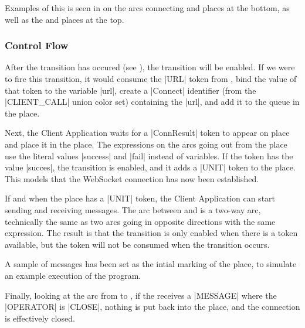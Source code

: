 		Examples of this is seen in  on the arcs connecting
		 and  places at the bottom, as well as the
		 and  places at the top.

	\subsubsection{Control Flow}
	
		After the  transition has occured (see ),
		the  transition will be enabled. If we were to fire this
		transition, it would consume the |URL| token from , bind
		the value of that token to the variable |url|, create a |Connect| identifier
		(from the |CLIENT_CALL| union color set) containing the |url|, and add it to
		the queue in the  place.
		
		Next, the Client Application waits for a |ConnResult| token to appear on
		place  and place it in the 
		place. The expressions on the arcs going out from the 
		place use the literal values |success| and |fail| instead of variables. If  the token has
		the value |succes|, the  transition is enabled, and it
		adds a |UNIT| token to the  place. This models
		that the WebSocket connection has now been established.
		
		If and when the  place has a |UNIT| token, the
		Client Application can start sending and receiving messages. The arc between
		 and  is a two-way arc,
		technically the same as two arcs going in opposite directions with the same
		expression.
		The result is that the transition is only enabled when there is a token
		available, but the token will not be consumed when the transition occurs. 
		
		A sample of messages has been set as the intial marking of the
		 place, to simulate an example execution of the program.
		
		Finally, looking at the arc from  to , if the  receives a |MESSAGE| where
		the |OPERATOR| is |CLOSE|, nothing is put back into the  place, and the connection is effectively closed.

